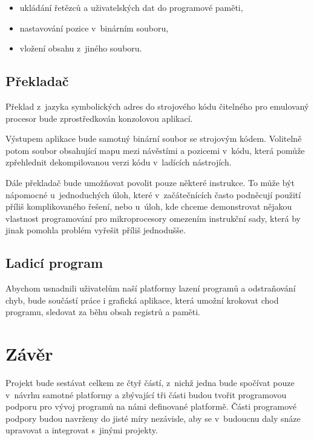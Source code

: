 \begin{itemize}
	\item ukládání řetězců a uživatelských dat do programové paměti,
	\item nastavování pozice v~binárním souboru,
	\item vložení obsahu z~jiného souboru.
\end{itemize}

\subsection{Překladač}

Překlad z~jazyka symbolických adres do strojového kódu čitelného pro emulovaný procesor bude zprostředkován konzolovou aplikací.

Výstupem aplikace bude samotný binární soubor se strojovým kódem. Volitelně potom soubor obsahující mapu mezi návěstími a pozicemi v~kódu, která pomůže zpřehlednit dekompilovanou verzi kódu v~ladících nástrojích.

Dále překladač bude umožňovat povolit pouze některé instrukce. To může být nápomocné u~jednoduchých úloh, které v~začátečnících často podněcují použití příliš komplikovaného řešení, nebo u~úloh, kde chceme demonstrovat nějakou vlastnost programování pro mikroprocesory omezením instrukční sady, která by jinak pomohla problém vyřešit příliš jednodušše.

\subsection{Ladicí program}

Abychom usnadnili uživatelům naší platformy lazení programů a odstraňování chyb, bude součástí práce i grafická aplikace, která umožní krokovat chod programu, sledovat za běhu obsah registrů a paměti.

\section{Závěr}

Projekt bude sestávat celkem ze čtyř částí, z~nichž jedna bude spočívat pouze v~návrhu samotné platformy a zbývající tři části budou tvořit programovou podporu pro vývoj programů na námi definované platformě. Části programové podpory budou navrženy do jisté míry nezávisle, aby se v~budoucnu daly snáze upravovat a integrovat s~jinými projekty.
